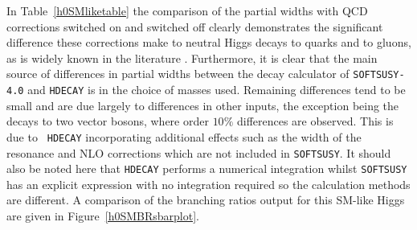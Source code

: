 \documentclass[final,3p,times]{elsarticle}
\begin{document}
In Table~\ref{h0SMliketable} the comparison of the partial widths with QCD corrections
switched on and switched off clearly demonstrates the significant difference
these corrections make to neutral Higgs decays to quarks and to gluons, as is
widely known in the literature
\cite{Djouadi:1996,Djouadi:1995,Spira:1998,Djouadi:2008}. Furthermore, it is
clear that the main source of differences in partial widths between the decay
calculator of {\tt SOFTSUSY-4.0} and {\tt HDECAY} is in the choice of masses
used. Remaining differences tend to be small and are due largely to
differences in other inputs, the exception being the decays to two vector
bosons, where order $10\%$ differences are observed. This is due to {\tt
  HDECAY} incorporating additional effects such as the width of the resonance
and NLO corrections which are not included in {\tt SOFTSUSY}. It
should also be noted here that {\tt HDECAY} performs a numerical integration
whilst {\tt SOFTSUSY} has an explicit expression with no integration required
so the calculation methods are different. A comparison of the branching ratios
output for this SM-like Higgs are given in Figure~\ref{h0SMBRsbarplot}. 
\end{document}
